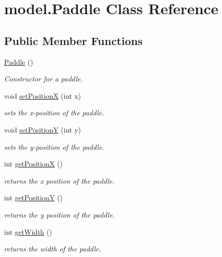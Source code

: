 \hypertarget{classmodel_1_1_paddle}{}\section{model.\+Paddle Class Reference}
\label{classmodel_1_1_paddle}
\subsection*{Public Member Functions}
\begin{DoxyCompactItemize}
\item 
\hyperlink{classmodel_1_1_paddle_a31a91190f01435357b55a3d6dc5171f9}{Paddle} ()
\begin{DoxyCompactList}\small\item\em Constructor for a paddle. \end{DoxyCompactList}\item 
void \hyperlink{classmodel_1_1_paddle_a717fb74f04387abc1b3633574ba555d0}{set\+PositionX} (int x)
\begin{DoxyCompactList}\small\item\em sets the x-\/position of the paddle. \end{DoxyCompactList}\item 
void \hyperlink{classmodel_1_1_paddle_a10161bfb478bcdeaf8fbfdac544c10f8}{set\+PositionY} (int y)
\begin{DoxyCompactList}\small\item\em sets the y-\/position of the paddle. \end{DoxyCompactList}\item 
int \hyperlink{classmodel_1_1_paddle_ae5abcff6c1e4f424284a42265b3eb8fd}{get\+PositionX} ()
\begin{DoxyCompactList}\small\item\em returns the x position of the paddle. \end{DoxyCompactList}\item 
int \hyperlink{classmodel_1_1_paddle_aaf41497a40221df4d394f5dea3937498}{get\+PositionY} ()
\begin{DoxyCompactList}\small\item\em returns the y position of the paddle. \end{DoxyCompactList}\item 
int \hyperlink{classmodel_1_1_paddle_a47751a93c5d4bdcf59ecf16b86c435b1}{get\+Width} ()
\begin{DoxyCompactList}\small\item\em returns the width of the paddle. \end{DoxyCompactList}\item 

\end{DoxyCompactItemize}
